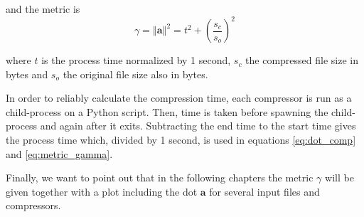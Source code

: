 and the metric is
\begin{equation} \label{eq:metric_gamma}
\gamma = \left\Vert \boldsymbol{a} \right\Vert ^2 = t^2 + \left(\frac{s_c}{s_o}\right)^2
\end{equation}

where $t$ is the process time normalized by 1 second, $s_c$ the compressed file size in bytes and $s_o$ the original file size also in bytes.

In order to reliably calculate the compression time, each compressor is run as a child-process on a Python script. Then, time is taken before spawning the child-process and again after it exits. Subtracting the end time to the start time gives the process time which, divided by 1 second, is used in equations \ref{eq:dot_comp} and \ref{eq:metric_gamma}.

Finally, we want to point out that in the following chapters the metric $\gamma$ will be given together with a plot including the dot $\boldsymbol{a}$ for several input files and compressors.
